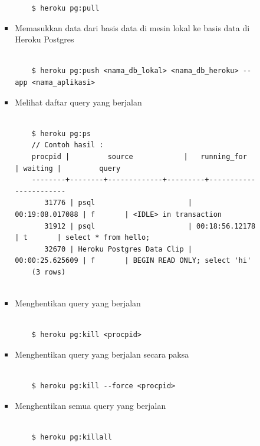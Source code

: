 \documentclass[a4paper,twoside]{article}
\begin{document}
\begin{enumerate}
\begin{enumerate}
\begin{itemize}
\begin{itemize}
\begin{lstlisting}
	$ heroku pg:pull

\end{lstlisting}

\item Memasukkan data dari basis data di mesin lokal ke basis data di Heroku Postgres

\begin{lstlisting}

	$ heroku pg:push <nama_db_lokal> <nama_db_heroku> --app <nama_aplikasi>

\end{lstlisting}

\item Melihat daftar query yang berjalan

\begin{lstlisting}

	$ heroku pg:ps
	// Contoh hasil :
	procpid |         source            |   running_for   | waiting |         query
	--------+--------+-------------+---------+-----------------------
	   31776 | psql                      | 00:19:08.017088 | f       | <IDLE> in transaction
	   31912 | psql                      | 00:18:56.12178  | t       | select * from hello;
	   32670 | Heroku Postgres Data Clip | 00:00:25.625609 | f       | BEGIN READ ONLY; select 'hi'
	(3 rows)
	
\end{lstlisting}

\item Menghentikan query yang berjalan

\begin{lstlisting}

	$ heroku pg:kill <procpid>

\end{lstlisting}

\item Menghentikan query yang berjalan secara paksa

\begin{lstlisting}

	$ heroku pg:kill --force <procpid>

\end{lstlisting}

\item Menghentikan semua query yang berjalan

\begin{lstlisting}

	$ heroku pg:killall

\end{lstlisting}


\end{itemize}
\end{itemize}
\end{enumerate}
\end{enumerate}
\end{document}
